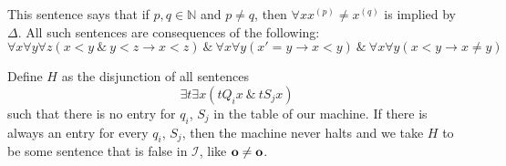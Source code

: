 \documentclass{article}
\newcommand{\N}{\mathbb{N}}
\theoremstyle{definition}
\theoremstyle{definition}
\begin{document}
\begin{enumerate}
This sentence says that if $p,q\in\N$ and $p\ne q$, then $\forall x x^{(p)}\ne x^{(q)}$ is implied by $\Delta$. All such sentences are consequences of the following:
\[\forall x\forall y\forall z (x < y\ \&\ y < z\rightarrow x<z)\ \&\ \forall x\forall y(x'=y\rightarrow x<y)\ \&\ \forall x\forall y(x<y\rightarrow x\ne y)\]

Define $H$ as the disjunction of all sentences
\[\exists t\exists x (tQ_i x\ \&\ tS_jx)\]
such that there is no entry for $q_i$, $S_j$ in the table of our machine. If there is always an entry for every $q_i$, $S_j$, then the machine never halts and we take $H$ to be some sentence that is false in $\mathscr{I}$, like $\mathbf{o}\ne \mathbf{o}$.

\end{enumerate}
\end{document}
